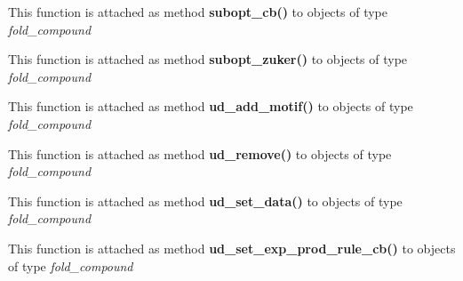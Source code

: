 \begin{DoxyRefList}
\item[\label{wrappers__wrappers000051}%
\Hypertarget{wrappers__wrappers000051}%
Global \mbox{\hyperlink{group__subopt__wuchty_ga1053837e6b6f158093508f8a70998352}{vrna\+\_\+subopt\+\_\+cb}} (vrna\+\_\+fold\+\_\+compound\+\_\+t $\ast$vc, int delta, vrna\+\_\+subopt\+\_\+callback $\ast$cb, void $\ast$data)]This function is attached as method {\bfseries subopt\+\_\+cb()} to objects of type {\itshape fold\+\_\+compound}  
\item[\label{wrappers__wrappers000052}%
\Hypertarget{wrappers__wrappers000052}%
Global \mbox{\hyperlink{group__subopt__zuker_gababde9d210eb433854f1e71da7815fbb}{vrna\+\_\+subopt\+\_\+zuker}} (vrna\+\_\+fold\+\_\+compound\+\_\+t $\ast$vc)]This function is attached as method {\bfseries subopt\+\_\+zuker()} to objects of type {\itshape fold\+\_\+compound}  
\item[\label{wrappers__wrappers000033}%
\Hypertarget{wrappers__wrappers000033}%
Global \mbox{\hyperlink{group__domains__up_gaec0c3313fb2951946614f920d289829a}{vrna\+\_\+ud\+\_\+add\+\_\+motif}} (vrna\+\_\+fold\+\_\+compound\+\_\+t $\ast$vc, const char $\ast$motif, double motif\+\_\+en, unsigned int loop\+\_\+type)]This function is attached as method {\bfseries ud\+\_\+add\+\_\+motif()} to objects of type {\itshape fold\+\_\+compound}  
\item[\label{wrappers__wrappers000034}%
\Hypertarget{wrappers__wrappers000034}%
Global \mbox{\hyperlink{group__domains__up_gada59cb0c498b812eadd010811af3f2d4}{vrna\+\_\+ud\+\_\+remove}} (vrna\+\_\+fold\+\_\+compound\+\_\+t $\ast$vc)]This function is attached as method {\bfseries ud\+\_\+remove()} to objects of type {\itshape fold\+\_\+compound}  
\item[\label{wrappers__wrappers000035}%
\Hypertarget{wrappers__wrappers000035}%
Global \mbox{\hyperlink{group__domains__up_gac1f18c312b91d80089534a87d956e58b}{vrna\+\_\+ud\+\_\+set\+\_\+data}} (vrna\+\_\+fold\+\_\+compound\+\_\+t $\ast$vc, void $\ast$data, vrna\+\_\+callback\+\_\+free\+\_\+auxdata $\ast$free\+\_\+cb)]This function is attached as method {\bfseries ud\+\_\+set\+\_\+data()} to objects of type {\itshape fold\+\_\+compound}  
\item[\label{wrappers__wrappers000037}%
\Hypertarget{wrappers__wrappers000037}%
Global \mbox{\hyperlink{group__domains__up_ga2fb1db2099da26c76247e1209ad4aa09}{vrna\+\_\+ud\+\_\+set\+\_\+exp\+\_\+prod\+\_\+rule\+\_\+cb}} (vrna\+\_\+fold\+\_\+compound\+\_\+t $\ast$vc, vrna\+\_\+callback\+\_\+ud\+\_\+exp\+\_\+production $\ast$pre\+\_\+cb, vrna\+\_\+callback\+\_\+ud\+\_\+exp\+\_\+energy $\ast$exp\+\_\+e\+\_\+cb)]This function is attached as method {\bfseries ud\+\_\+set\+\_\+exp\+\_\+prod\+\_\+rule\+\_\+cb()} to objects of type {\itshape fold\+\_\+compound}  

\end{DoxyRefList}
